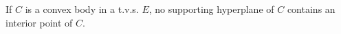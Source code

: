 If $C$ is a convex body in a t.v.s. $E$, no supporting hyperplane of $C$ contains an interior point of $C$.
